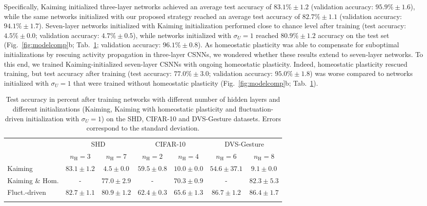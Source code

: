 \documentclass[11pt,a4paper]{article}
\begin{document}
Specifically, Kaiming initialized three-layer networks achieved an average test accuracy of $83.1\%\pm1.2$ (validation accuracy: $ 95.9\%\pm 1.6$), while the same networks initialized with our proposed strategy reached an average test accuracy of $82.7\%\pm1.1$ (validation accuracy: $94.1 \%\pm1.7 $).
Seven-layer networks initialized with Kaiming initialization performed close to chance level after training (test accuracy: $4.5\%\pm 0.0$; validation accuracy: $4.7 \%\pm 0.5$), while networks initialized with $\sigma_U=1$ reached $80.9\%\pm1.2$ accuracy on the test set (Fig.~\ref{fig:modelcomp}b; Tab.~\ref{tab:acc_deep}; validation accuracy: $96.1 \%\pm 0.8$). 
As homeostatic plasticity was able to compensate for suboptimal initializations by rescuing activity propagation in three-layer \acp{CSNN}, we wondered whether these results extend to seven-layer networks.
To this end, we trained Kaiming-initialized seven-layer \acp{CSNN} with ongoing homeostatic plasticity.
Indeed, homeostatic plasticity rescued training, but test accuracy after training (test accuracy: $77.0\%\pm 3.0$; validation accuracy: $95.0 \%\pm 1.8$) was worse compared to networks initialized with $\sigma_U=1$ that were trained without homeostatic plasticity (Fig.~\ref{fig:modelcomp}b; Tab.~\ref{tab:acc_deep}).


\begin{table}[b]
\def\arraystretch{1.4}
\setlength{\tabcolsep}{5pt}
\caption{Test accuracy in percent after training networks with different number of hidden layers and different initializations (Kaiming, Kaiming with homeostatic plasticity and fluctuation-driven initialization with $\sigma_U = 1$) on the SHD, CIFAR-10 and DVS-Gesture datasets. Errors correspond to the standard deviation.}
\centering
\begin{tabular*}{\textwidth}{@{\extracolsep{\fill}}lcccccc}
\toprule
& \multicolumn{2}{c}{SHD}
& \multicolumn{2}{c}{CIFAR-10}
& \multicolumn{2}{c}{DVS-Gesture}
 \\
 & $n_{\mathrm{H}}=3$ & $n_{\mathrm{H}}=7$ & $n_{\mathrm{H}}=2$ & $n_{\mathrm{H}}=4$ & $n_{\mathrm{H}}=6$ & $n_{\mathrm{H}}=8$\\
\midrule
Kaiming &  $83.1\pm1.2$ & $4.5\pm0.0$ & $59.5 \pm 0.8 $ & $10.0 \pm 0.0 $ & $54.6 \pm 37.1 $ & $9.1 \pm 0.0 $ \\
Kaiming \& Hom. & - & $77.0  \pm 2.9 $  & - & $70.3 \pm 0.9 $  & - & $82.3 \pm 5.3 $ \\
Fluct.-driven & $82.7 \pm 1.1 $  & $80.9 \pm 1.2 $  & $62.4 \pm 0.3 $ & $65.6 \pm 1.3 $  & $86.7 \pm 1.2 $  & $86.4 \pm 1.7 $ \\
\addlinespace
\bottomrule
\end{tabular*}
\label{tab:acc_deep}
\end{table}
\end{document}

